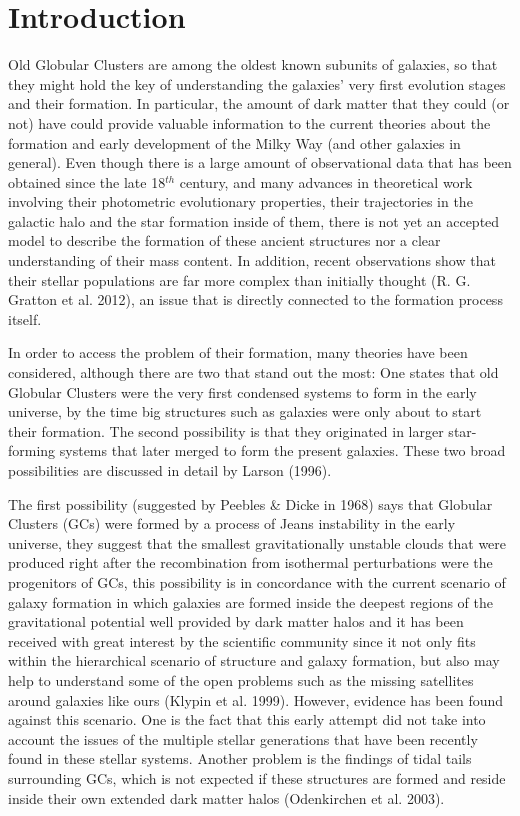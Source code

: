 \chapter{Introduction}

Old Globular Clusters are among the oldest known subunits of galaxies, so that they might hold the key of understanding the galaxies' very first evolution stages and their formation. In particular, the amount of dark matter that they could (or not) have could provide valuable information to the current theories about the formation and early development of the Milky Way (and other galaxies in general). Even though there is a large amount of observational data that has been obtained since the late 18$^{th}$ century, and many advances in theoretical work involving their photometric evolutionary properties, their trajectories in the galactic halo and the star formation inside of them, there is not yet an accepted model to describe the formation of these ancient structures nor a clear understanding of their mass content. In addition, recent observations show that their stellar populations are far more complex than initially thought (R. G. Gratton et al. 2012), an issue that is directly connected to the formation process itself. 

In order to access the problem of their formation, many theories have been considered, although there are two that stand out the most: One states that old Globular Clusters were the very first condensed systems to form in the early universe, by the time big structures such as galaxies were only about to start their formation. The second possibility is that they originated in larger star-forming systems that later merged to form the present galaxies. These two broad possibilities are discussed in detail by Larson (1996).

The first possibility (suggested by Peebles \& Dicke in 1968) says that Globular Clusters (GCs) were formed by a process of Jeans instability in the early universe, they suggest that the smallest gravitationally unstable clouds that were produced right after the recombination from isothermal perturbations were the progenitors of GCs, this possibility is in concordance with the current scenario of galaxy formation in which galaxies are formed inside the deepest regions of the gravitational potential well provided by dark matter halos and it has been received with great interest by the scientific community since it not only fits within the hierarchical scenario of structure and galaxy formation, but also may help to understand some of the open problems such as the missing satellites around galaxies like ours (Klypin et al. 1999). However, evidence has been found against this scenario. One is the fact that this early attempt did not take into account the issues of the multiple stellar generations that have been recently found in these stellar systems. Another problem is the findings of tidal tails surrounding GCs, which is not expected if these structures are formed and reside inside their own extended dark matter halos (Odenkirchen et al. 2003).

